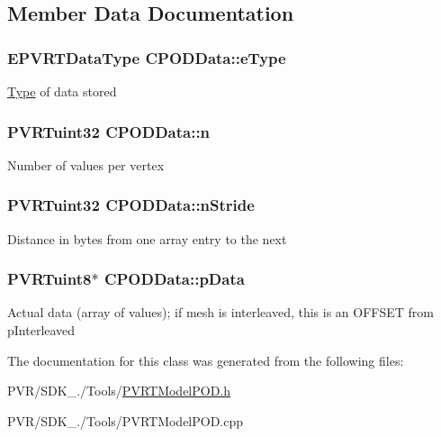 \subsection{Member Data Documentation}
\hypertarget{class_c_p_o_d_data_aadf7a49b185833b74d8363dd18ffbae5}{
\subsubsection[{e\+Type}]{\setlength{\rightskip}{0pt plus 5cm}E\+P\+V\+R\+T\+Data\+Type C\+P\+O\+D\+Data\+::e\+Type}}\label{class_c_p_o_d_data_aadf7a49b185833b74d8363dd18ffbae5}
\hyperlink{struct_type}{Type} of data stored \hypertarget{class_c_p_o_d_data_a4102d7abbc069d774442f6aa961b4c54}{
\subsubsection[{n}]{\setlength{\rightskip}{0pt plus 5cm}P\+V\+R\+Tuint32 C\+P\+O\+D\+Data\+::n}}\label{class_c_p_o_d_data_a4102d7abbc069d774442f6aa961b4c54}
Number of values per vertex \hypertarget{class_c_p_o_d_data_afabb6ae34ec70b41b60a263ec2d121b6}{
\subsubsection[{n\+Stride}]{\setlength{\rightskip}{0pt plus 5cm}P\+V\+R\+Tuint32 C\+P\+O\+D\+Data\+::n\+Stride}}\label{class_c_p_o_d_data_afabb6ae34ec70b41b60a263ec2d121b6}
Distance in bytes from one array entry to the next \hypertarget{class_c_p_o_d_data_a82a019e63f8b970beff5a1f2ba72322c}{
\subsubsection[{p\+Data}]{\setlength{\rightskip}{0pt plus 5cm}P\+V\+R\+Tuint8$\ast$ C\+P\+O\+D\+Data\+::p\+Data}}\label{class_c_p_o_d_data_a82a019e63f8b970beff5a1f2ba72322c}
Actual data (array of values); if mesh is interleaved, this is an O\+F\+F\+S\+E\+T from p\+Interleaved 

The documentation for this class was generated from the following files\+:\begin{DoxyCompactItemize}
\item 
P\+V\+R/\+S\+D\+K\+\_./\+Tools/\hyperlink{_p_v_r_t_model_p_o_d_8h}{P\+V\+R\+T\+Model\+P\+O\+D.\+h}\item 
P\+V\+R/\+S\+D\+K\+\_./\+Tools/P\+V\+R\+T\+Model\+P\+O\+D.\+cpp\end{DoxyCompactItemize}
